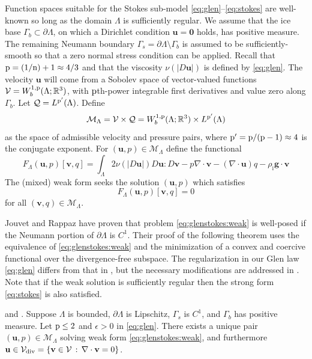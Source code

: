 \documentclass[hidelinks,onefignum,onetabnum,final]{siamart220329}  %
\newcommand{\eps}{\epsilon}
\newcommand{\RR}{\mathbb{R}}
\newcommand{\Div}{\nabla\cdot}
\newcommand{\bg}{\mathbf{g}}
\newcommand{\bu}{\mathbf{u}}
\newcommand{\bv}{\mathbf{v}}
\newcommand{\bzero}{\bm{0}}
\newcommand{\cQ}{\mathcal{Q}}
\newcommand{\cV}{\mathcal{V}}
\newcommand{\nn}{{\text{\textnormal{n}}}}
\newcommand{\pp}{{\text{\textnormal{p}}}}
\newcommand{\rhoi}{\rho_{\text{i}}}
\newcommand{\Vdiv}{\cV_{\text{\textnormal{div}}}}
\begin{document}
Function spaces suitable for the Stokes sub-model \eqref{eq:glen}--\eqref{eq:stokes} are well-known so long as the domain $\Lambda$ is sufficiently regular.  We assume that the ice base $\Gamma_b\subset\partial \Lambda$, on which a Dirichlet condition $\bu=\bzero$ holds, has positive measure.  The remaining Neumann boundary $\Gamma_s = \partial \Lambda \setminus \Gamma_b$ is assumed to be sufficiently-smooth so that a zero normal stress condition can be applied.  Recall that $\pp=(1/\nn)+1\approx 4/3$ and that the viscosity $\nu(|D\bu|)$ is defined by \eqref{eq:glen}.  The velocity $\bu$ will come from a Sobolev space \cite{Evans2010} of vector-valued functions $\cV = W_b^{1,\pp}(\Lambda; \RR^3)$, with $\pp$th-power integrable first derivatives and value zero along $\Gamma_b$.  Let $\cQ=L^{\pp'}(\Lambda)$.  Define
\begin{equation}
\mathcal{M}_\Lambda = \cV \times \cQ = W_b^{1,\pp}(\Lambda; \RR^3) \times L^{\pp'}(\Lambda) \label{eq:glenstokes:mixedspace}
\end{equation}
as the space of admissible velocity and pressure pairs, where $\pp'=\pp/(\pp-1)\approx 4$ is the conjugate exponent.  For $(\bu,p) \in \mathcal{M}_\Lambda$ define the functional
\begin{equation}
F_\Lambda(\bu,p)[\bv,q] = \int_\Lambda 2 \nu(|D\bu|) D\bu : D\bv - p \Div\bv - (\Div\bu) q - \rhoi \bg \cdot \bv \label{eq:glenstokes:fcnl}
\end{equation}
The (mixed) weak form seeks the solution $(\bu,p)$ which satisfies
\begin{equation}
F_\Lambda(\bu,p)[\bv,q] = 0 \label{eq:glenstokes:weak}
\end{equation}
for all $(\bv,q) \in \mathcal{M}_\Lambda$.

Jouvet and Rappaz \cite{JouvetRappaz2011} have proven that problem \eqref{eq:glenstokes:weak} is well-posed if the Neumann portion of $\partial\Lambda$ is $C^1$.  Their proof of the following theorem uses the equivalence of \eqref{eq:glenstokes:weak} and the minimization of a convex and coercive functional over the divergence-free subspace.  The regularization in our Glen law \eqref{eq:glen} differs from that in \cite{JouvetRappaz2011}, but the necessary modifications are addressed in \cite{IsaacStadlerGhattas2015}.  Note that if the weak solution is sufficiently regular then the strong form \eqref{eq:stokes} is also satisfied.

\begin{theorem} \label{thm:stokeswellposed} \cite[Theorem 3.10]{JouvetRappaz2011} and \cite[Appendix A]{IsaacStadlerGhattas2015}.  Suppose $\Lambda$ is bounded, $\partial\Lambda$ is Lipschitz, $\Gamma_s$ is $C^1$, and $\Gamma_b$ has positive measure.  Let $\pp\le 2$ and $\eps>0$ in \eqref{eq:glen}.  There exists a unique pair $(\bu,p) \in \mathcal{M}_\Lambda$ solving weak form \eqref{eq:glenstokes:weak}, and furthermore $\bu\in \Vdiv = \{\bv\in\cV\,:\,\Div\bv=0\}$.
\end{theorem}
\end{document}
